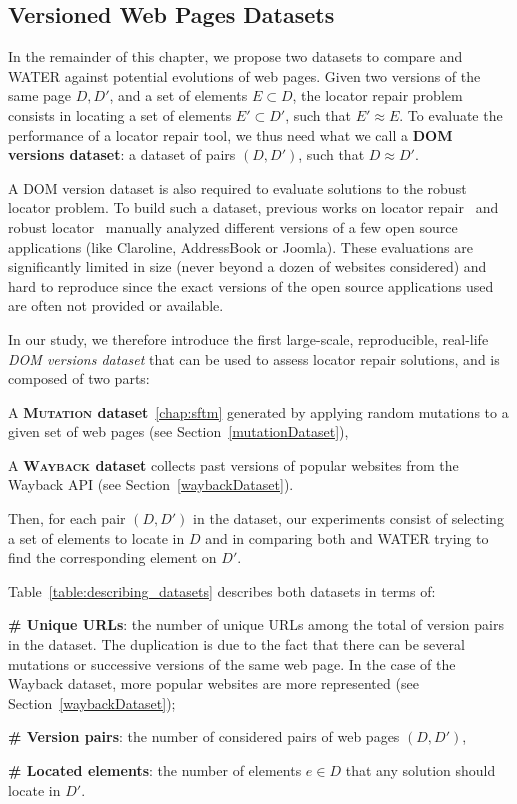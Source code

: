 \subsection{Versioned Web Pages Datasets}
In the remainder of this chapter, we propose two datasets to compare \erratum{} and WATER against potential evolutions of web pages.
Given two versions of the same page $D, D'$, and a set of elements $E \subset D$, the locator repair problem consists in locating a set of elements $E' \subset D'$, such that $E' \approx E$.
To evaluate the performance of a locator repair tool, we thus need what we call a \textbf{DOM versions dataset}: a dataset of pairs $(D, D')$, such that $D \approx D'$.

A DOM version dataset is also required to evaluate solutions to the robust locator problem.
To build such a dataset, previous works on locator repair~\cite{leotta2016robula+,leotta2014reducing} and robust locator~\cite{stocco2018visual,choudhary2011water,hammoudi2016waterfall} manually analyzed different versions of a few open source applications (like Claroline, AddressBook or Joomla).
These evaluations are significantly limited in size (never beyond a dozen of websites considered) and hard to reproduce since the exact versions of the open source applications used are often not provided or available.

In our study, we therefore introduce the first large-scale, reproducible, real-life \textit{DOM versions dataset} that can be used to assess locator repair solutions, and is composed of two parts:
\begin{compactenum}
    \item A {\bf \textsc{Mutation} dataset}~\ref{chap:sftm} generated by applying random mutations to a given set of web pages (see Section~\ref{mutationDataset}),
    \item A {\bf \textsc{Wayback} dataset} collects past versions of popular websites from the Wayback API (see Section~\ref{waybackDataset}).
\end{compactenum}

Then, for each pair $(D, D')$ in the dataset, our experiments consist of selecting a set of elements to locate in $D$ and in comparing both \erratum{} and WATER trying to find the corresponding element on $D'$.

Table~\ref{table:describing_datasets} describes both datasets in terms of:
\begin{compactenum}
    \item \textbf{\# Unique URLs}: the number of unique URLs among the total of version pairs in the dataset. The duplication is due to the fact that there can be several mutations or successive versions of the same web page. In the case of the {\sc Wayback} dataset, more popular websites are more represented (see Section~\ref{waybackDataset});
    \item \textbf{\# Version pairs}: the number of considered pairs of web pages $(D, D')$,
    \item \textbf{\# Located elements}: the number of elements $e \in D$ that any solution should locate in $D'$.
\end{compactenum}

